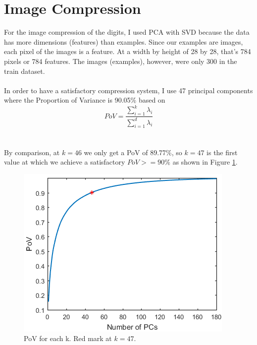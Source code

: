 \documentclass[a4paper,11pt,twocolumn]{article}
\begin{document}
\section{Image Compression}
For the image compression of the digits, I used PCA with SVD because the data has more dimensions (features) than examples. Since our examples are images, each pixel of the images is a feature. At a width by height of 28 by 28, that's 784 pixels or 784 features. The images (examples), however, were only 300 in the train dataset.
\\\\
In order to have a satisfactory compression system, I use 47 principal components where the Proportion of Variance is 90.05\% based on
$$PoV = \frac{\sum_{i=1}^{k} \lambda_{i}}{\sum_{i=1}^{d} \lambda_{i}}$$
\\\\
By comparison, at $k = 46$ we only get a PoV of 89.77\%, so $k = 47$ is the first value at which we achieve a satisfactory $PoV >= 90\%$ as shown in Figure \ref{fig:fig4}.

\begin{figure}[!h]
  \centering
  \includegraphics[width=\linewidth]{figures/PoV.png}
  \caption{PoV for each k. Red mark at $k = 47$.}
  \label{fig:fig4}
\end{figure}
\end{document}
